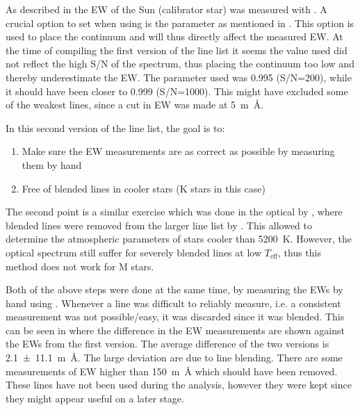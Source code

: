 As described in  the EW of the Sun (calibrator star) was measured with
. A crucial option to set when using  is the  parameter as
mentioned in . This option is used to place the continuum and will thus directly
affect the measured EW. At the time of compiling the first version of the line list it seems the
 value used did not reflect the high S/N of the spectrum, thus placing the continuum too
low and thereby underestimate the EW. The  parameter used was 0.995 (S/N=200), while it
should have been closer to 0.999 (S/N=1000). This might have excluded some of the weakest lines,
since a cut in EW was made at \SI{5}{m\angstrom}.

In this second version of the line list, the goal is to:
\begin{enumerate}
  \item Make sure the EW measurements are as correct as possible by measuring them by hand
  \item Free of blended lines in cooler stars (K stars in this case)
\end{enumerate}
The second point is a similar exercise which was done in the optical by \citet{Tsantaki2013}, where
blended lines were removed from the larger line list by \citet{Sousa2008a}. This allowed to
determine the atmospheric parameters of stars cooler than \SI{5200}{K}. However, the optical
spectrum still suffer for severely blended lines at low $T_\mathrm{eff}$, thus this method does not
work for M stars.

Both of the above steps were done at the same time, by measuring the EWs by hand using .
Whenever a line was difficult to reliably measure, i.e. a consistent measurement was not
possible/easy, it was discarded since it was blended. This can be seen in
 where the difference in the EW measurements are shown against the EWs
from the first version. The average difference of the two versions is \SI{2.1+-11.1}{m\angstrom}.
The large deviation are due to line blending. There are some measurements of EW higher than
\SI{150}{m\angstrom} which should have been removed. These lines have not been used during the
analysis, however they were kept since they might appear useful on a later stage.

